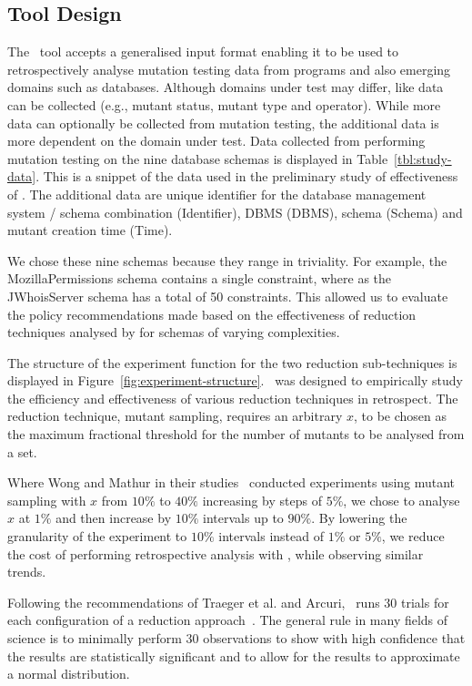 \subsection{Tool Design}

The \mr~tool accepts a generalised input format enabling it to be used to retrospectively
analyse mutation testing data from programs and also emerging domains such as databases.
Although domains under test may differ, like data can be collected (e.g., mutant status,
mutant type and operator). While more data can optionally be collected from mutation
testing, the additional data is more dependent on the domain under test. Data collected
from performing mutation testing on the nine database schemas is displayed in Table~\ref{tbl:study-data}.
This is a snippet of the data used in the preliminary study of effectiveness of \mr.
The additional data are unique identifier for the database management system / schema combination
(Identifier), DBMS (DBMS), schema (Schema) and mutant creation time (Time).

We chose these nine schemas because they range in triviality. For example, the MozillaPermissions
schema contains a single constraint, where as the JWhoisServer schema has a total of 50
constraints. This allowed us to evaluate the policy recommendations made based on the
effectiveness of reduction techniques analysed by \mr for schemas of varying complexities.

The structure of the experiment function for the two reduction sub-techniques is displayed
in Figure~\ref{fig:experiment-structure}. \mr~was designed to empirically study the efficiency
and effectiveness of various reduction techniques in retrospect. The reduction technique,
mutant sampling, requires an arbitrary $x$, to be chosen as the maximum fractional threshold
for the number of mutants to be analysed from a set.

Where Wong and Mathur in their studies~\cite{mathur1994empirical, wong1993mutation} conducted
experiments using mutant sampling with $x$ from $10\%$ to $40\%$ increasing by steps of $5\%$, we
chose to analyse $x$ at $1\%$ and then increase by $10\%$ intervals up to $90\%$. By lowering
the granularity of the experiment to $10\%$ intervals instead of $1\%$ or $5\%$, we reduce the
cost of performing retrospective analysis with \mr, while observing similar trends.

Following the recommendations of Traeger et al. and Arcuri, \mr~runs 30 trials for each configuration
of a reduction approach~\cite{traeger2008nine, arcuri2014hitchhiker}. The general rule in many
fields of science is to minimally perform 30 observations to show with high confidence that the results
are statistically significant and to allow for the results to approximate a normal distribution.
